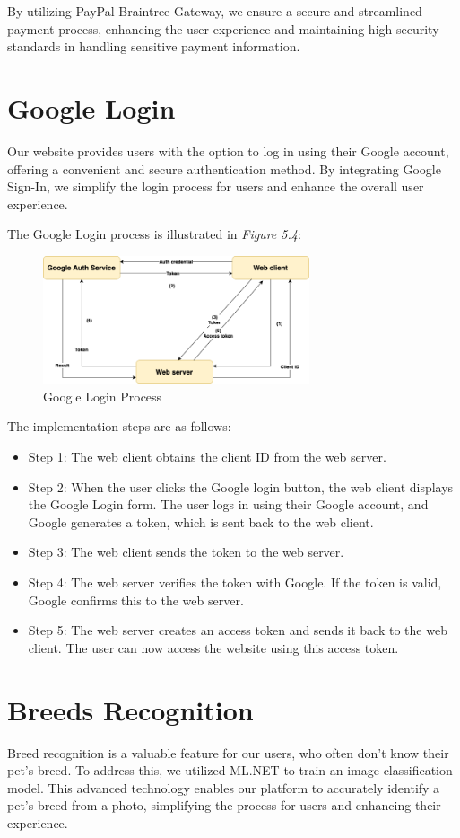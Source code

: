 By utilizing PayPal Braintree Gateway, we ensure a secure and streamlined payment process, enhancing the user experience and maintaining high security standards in handling sensitive payment information.

\section{Google Login}
Our website provides users with the option to log in using their Google account, 
offering a convenient and secure authentication method. By integrating Google Sign-In, 
we simplify the login process for users and enhance the overall user experience. 

The Google Login process is illustrated in \emph{Figure 5.4}:
\begin{figure}[H]
    \centering
    \includegraphics[width=0.7\textwidth]{Figures/Implementation/GoogleLogin.png}
    \caption{Google Login Process}
\end{figure}

The implementation steps are as follows:
\begin{itemize}
    \item Step 1: The web client obtains the client ID from the web server.
    \item Step 2: When the user clicks the Google login button, the web client displays the Google Login form. The user logs in using their Google account, and Google generates a token, which is sent back to the web client.
    \item Step 3: The web client sends the token to the web server.
    \item Step 4: The web server verifies the token with Google. If the token is valid, Google confirms this to the web server.
    \item Step 5: The web server creates an access token and sends it back to the web client. The user can now access the website using this access token.
\end{itemize}

\section{Breeds Recognition}
Breed recognition is a valuable feature for our users, who often don't know their pet's breed. To address this, we utilized ML.NET 
to train an image classification model. This advanced technology enables our platform to accurately identify a pet's breed from a photo, 
simplifying the process for users and enhancing their experience.

